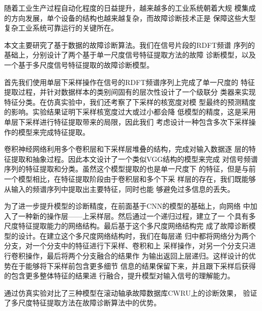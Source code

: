 \begin{cabstract}
  随着工业生产过程自动化程度的日益提升，越来越多的工业系统朝着大规
  模集成的方向发展，单个设备的结构也越来越复杂，而故障诊断技术正是
  保障这些大型复杂工业系统可靠运行的关键所在。

  本文主要研究了基于数据的故障诊断算法。我们在信号片段的RDFT频谱
  序列的基础上，分别设计了两个基于单一尺度信号特征提取方法的故障
  诊断模型，以及一个基于多尺度信号特征提取的故障诊断模型。

  首先我们使用单层下采样操作在信号的RDFT频谱序列上完成了单一尺度的
  特征提取过程，并针对数据样本的类别间固有的层次性设计了一个级联分
  类器来实现特征分类。在仿真实验中，我们还考察了下采样的核宽度对模
  型最终的预测精度的影响。实验结果证明下采样核宽度过大或过小都会降
  低模型的精度，这是采用单层下采样进行特征提取带来的局限，因此我们
  考虑设计一种包含多次下采样操作的模型来完成特征提取。

  卷积神经网络利用多个卷积层和下采样层堆叠的结构，完成对输入数据逐
  层的特征提取和抽象过程。因此本文设计了一个类似VGG结构的模型来完成
  对信号频谱序列的特征提取和分类。虽然这个模型提取的也是单一尺度下
  的特征，但是与前一个模型相比，在特征提取阶段由于卷积层和多个下采
  样层的存在，我们既能够从输入的频谱序列中提取出主要特征，同时也能
  够避免过多信息的丢失。

  为了进一步提升模型的诊断精度，在前面基于CNN的模型的基础上，向网络
  中加入了一种新的操作层——上采样层。然后通过一个递归过程，建立了一
  个具有多尺度特征提取能力的网络结构。最后基于这个多尺度网络结构完
  成了故障诊断模型的设计。在建立这个多尺度网络结构时，我们在每层递
  归中都将网络分为两个分支，对一个分支中的特征进行下采样、卷积和上
  采样操作，对另一个分支只进行卷积操作，最后将两个分支融合的结果作
  为输出返回上层递归。这样设计的优势在于能够将下采样前包含更多细节
  信息的结果保留下来，并且跟下采样后获得的包含更多整体特征的结果进
  行融合，提升模型对输入信号的理解能力。

  通过仿真实验对比了三种模型在滚动轴承故障数据库CWRU上的诊断效果，
  验证了多尺度特征提取方法在故障诊断算法中的优势。
\end{cabstract}


